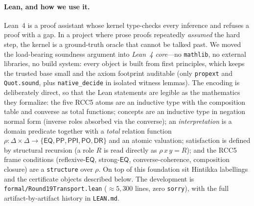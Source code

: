 \documentclass[11pt]{article}
\newcommand{\DR}{\mathsf{DR}}
\newcommand{\PO}{\mathsf{PO}}
\newcommand{\PP}{\mathsf{PP}}
\newcommand{\PPI}{\mathsf{PPI}}
\newcommand{\EQ}{\mathsf{EQ}}
\theoremstyle{plain}
\theoremstyle{definition}
\begin{document}
\paragraph{Lean, and how we use it.} Lean~4 is a proof assistant whose
kernel type-checks every inference and refuses a proof with a gap. In a
project where prose proofs repeatedly \emph{assumed} the hard step, the
kernel is a ground-truth oracle that cannot be talked past. We moved the
load-bearing soundness argument into \emph{Lean~4 core}---no
\texttt{mathlib}, no external libraries, no build system: every object is
built from first principles, which keeps the trusted base small and the
axiom footprint auditable (only \texttt{propext} and \texttt{Quot.sound},
plus \texttt{native\_decide} in isolated witness lemmas). The encoding is
deliberately direct, so that the Lean statements are legible as the
mathematics they formalize: the five RCC5 atoms are an inductive type with
the composition table and converse as total functions; concepts are an
inductive type in negation normal form (inverse roles absorbed via the
converse); an \emph{interpretation} is a domain predicate together with a
\emph{total} relation function $\rho:\Delta\times\Delta\to\{\EQ,\PP,\PPI,
\PO,\DR\}$ and an atomic valuation; satisfaction is defined by structural
recursion (a role $R$ is read directly as $\rho\,x\,y=R$); and the RCC5
frame conditions (reflexive-$\EQ$, strong-$\EQ$, converse-coherence,
composition closure) are a \texttt{structure} over $\rho$. On top of this
foundation sit Hintikka labellings and the certificate objects described
below. The development is \texttt{formal/Round19Transport.lean}
(${\approx}5{,}300$ lines, zero \texttt{sorry}), with the full
artifact-by-artifact history in \texttt{LEAN.md}.
\end{document}
